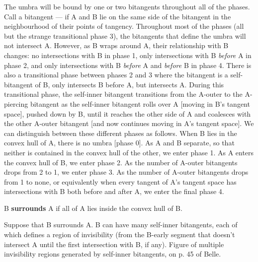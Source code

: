 \documentclass[12pt]{article}
\begin{document}
The umbra will be bound by one or two bitangents throughout all of the phases.
Call a bitangent --- if A and B lie on the same side of the bitangent in the neighbourhood
of their points of tangency.
Throughout most of the phases (all but the strange transitional phase 3), 
the bitangents that define the umbra will not intersect A.
However, as B wraps around A, their relationship with B changes:
no intersections with B in phase 1,
only intersections with B {\em before} A in phase 2, and
only intersections with B {\em before} A and {\em before} B in phase 4.
There is also a transitional phase between phases 2 and 3 where the bitangent
is a self-bitangent of B, only intersects B before A, but intersects A.
%
During this transitional phase, the self-inner bitangent transitions from the A-outer
to the A-piercing bitangent as the self-inner bitangent rolls over A [moving in B's
tangent space], pushed down by B, until it reaches the other side of A and
coalesces with the other A-outer bitangent [and now continues moving in A's tangent 
space].
%
We can distinguish between these different phases as follows.
When B lies in the convex hull of A, there is no umbra [phase 0].
As A and B separate, so that neither is contained in the convex hull of the other,
we enter phase 1.
As A enters the convex hull of B, we enter phase 2.
As the number of A-outer bitangents drops from 2 to 1, we enter phase 3.
As the number of A-outer bitangents drops from 1 to none, or equivalently
when every tangent of A's tangent space has intersections with B both before and after A,
we enter the final phase 4.

\clearpage

\begin{defn2}
B {\bf surrounds} A if all of A lies inside the convex hull of B.
\end{defn2}

\begin{lemma}
Suppose that B surrounds A. 
B can have many self-inner bitangents, each of which defines a region of invisibility
(from the B-early segment that doesn't intersect A until the first intersection with B,
if any).
Figure of multiple invisibility regions generated by self-inner bitangents, 
on p. 45 of Belle.
\end{lemma}
\end{document}

